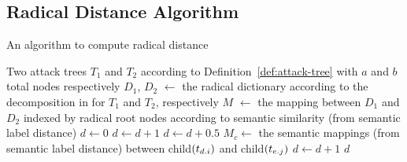 \subsection{Radical Distance Algorithm}
\label{appendix:alg:radical-distance}
\begin{algorithm}[H]
    \caption{An algorithm to compute radical distance}
    \label{alg:recursive-radical}
    \begin{algorithmic}
        \State Two attack trees $T_1$ and $T_2$ according to Definition~\ref{def:attack-tree} with $a$ and $b$ total nodes respectively
\State $D_1$, $D_2$ $\gets$ the radical dictionary according to the decomposition in \cite{schiele2021novel} for $T_1$ and $T_2$, respectively
        \State $M$ $\gets$ the mapping between $D_1$ and $D_2$ indexed by radical root nodes according to semantic similarity (from semantic label distance)
        \State $d \gets 0$
        \State $d \gets d + 1$
        \EndIf
        \State $d \gets d + 0.5$
        \EndIf
        \State $M_c \gets$ the semantic mappings (from semantic label distance) between child$(t_{{d}.{i}})$ and child$(t_{{e}.{j}})$
        \State $d \gets d + 1$
        \EndIf
        \EndIf
        \EndFor
        \EndFor
        \State \Return $d$
    \end{algorithmic}
\end{algorithm}
















